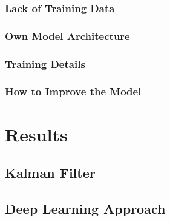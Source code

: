 \documentclass{article}
\begin{document}
\subsubsection{Lack of Training Data}

\subsubsection{Own Model Architecture}

\subsubsection{Training Details}

\subsubsection{How to Improve the Model}

\section{Results}


\subsection{Kalman Filter}
\label{results_kalman_filter}

\subsection{Deep Learning Approach}
\end{document}
